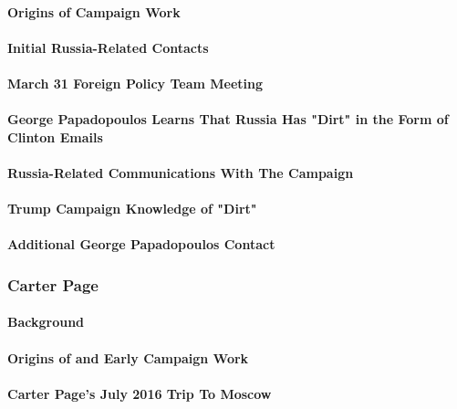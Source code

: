 \paragraph{Origins of Campaign Work}

\paragraph{Initial Russia-Related Contacts}

\paragraph{March 31 Foreign Policy Team Meeting}

\paragraph{George Papadopoulos Learns That Russia Has "Dirt" in the Form of Clinton Emails}

\paragraph{Russia-Related Communications With The Campaign}

\paragraph{Trump Campaign Knowledge of "Dirt"}

\paragraph{Additional George Papadopoulos Contact}

\subsubsection{Carter Page}

\paragraph{Background}

\paragraph{Origins of and Early Campaign Work}

\paragraph{Carter Page's July 2016 Trip To Moscow}

